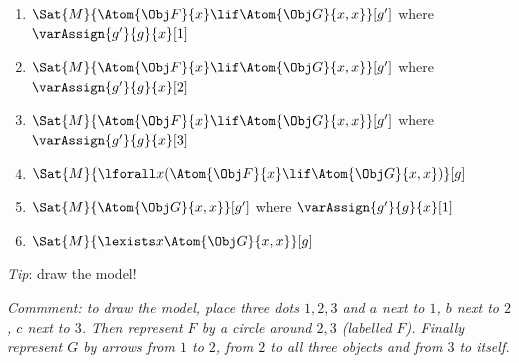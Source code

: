 \documentclass[../../../../include/open-logic-section]{subfiles}
\begin{document}
\begin{prob}
\begin{enumerate}
	\item $\Sat{M}{\Atom{\Obj F}{x}\lif \Atom{\Obj G}{x,x}}[g']$ where $\varAssign{g'}{g}{x}[1]$
	\item $\Sat{M}{\Atom{\Obj F}{x}\lif \Atom{\Obj G}{x,x}}[g']$ where $\varAssign{g'}{g}{x}[2]$
	\item $\Sat{M}{\Atom{\Obj F}{x}\lif \Atom{\Obj G}{x,x}}[g']$ where $\varAssign{g'}{g}{x}[3]$
	\item $\Sat{M}{\lforall x(\Atom{\Obj F}{x}\lif \Atom{\Obj G}{x,x})}[g]$
	\item $\Sat{M}{\Atom{\Obj G}{x,x}}[g']$ where $\varAssign{g'}{g}{x}[1]$
	\item $\Sat{M}{\lexists x\Atom{\Obj G}{x,x}}[g]$
\end{enumerate}
\emph{Tip}: draw the model! 
\begin{ans}
\emph{Commment: to draw the model, place three dots $1,2,3$ and $a$ next to $1$, $b$ 
next to $2$, $c$ next to $3$. Then represent $F$ by a circle around $2,3$ (labelled $F$). 
Finally represent $G$ by arrows from $1$ to $2$, from $2$ to all three objects and from
$3$ to itself.}


\end{ans}
\end{prob}
\end{document}
